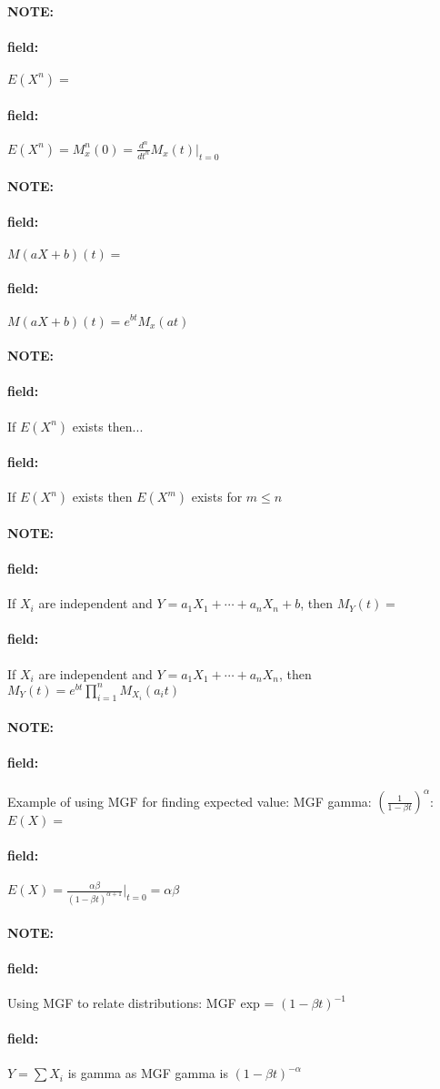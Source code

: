 \documentclass[12pt]{article}
\newenvironment{note}{\paragraph{NOTE:}}{}
\newenvironment{field}{\paragraph{field:}}{}
\begin{document}
\begin{note}
  \begin{field}
    $E(X^n) = $
  \end{field}
  \begin{field}
    $E(X^n) = M_x^n(0) = \frac{d^n}{dt^n}M_x(t)|_{t=0}$
  \end{field}
\end{note}

\begin{note}
  \begin{field}
    $M(aX + b)(t) = $
  \end{field}
  \begin{field}
    $M(aX + b)(t) = e^{bt}M_x(at)$
  \end{field}
\end{note}

\begin{note}
  \begin{field}
    If $E(X^n)$ exists then...
  \end{field}
  \begin{field}
    If $E(X^n)$ exists then $E(X^m)$ exists for $m \leq n$
  \end{field}
\end{note}

\begin{note}
  \begin{field}
    If $X_i$ are independent and $Y = a_1X_1 + \cdots + a_nX_n + b$, then $M_Y(t) = $
  \end{field}
  \begin{field}
    If $X_i$ are independent and $Y = a_1X_1 + \cdots + a_nX_n$, then $M_Y(t) = e^{bt}\prod_{i=1}^n M_{X_i}(a_i t) $
  \end{field}
\end{note}

\begin{note}
  \begin{field}
    Example of using MGF for finding expected value:
    MGF gamma: $(\frac{1}{1 - \beta t})^\alpha$: $E(X) = $
  \end{field}
  \begin{field}
    $E(X) = \frac{\alpha\beta}{(1 - \beta t)^{\alpha+1}}|_{t=0} = \alpha \beta$
  \end{field}
\end{note}

\begin{note}
  \begin{field}
    Using MGF to relate distributions: MGF exp = $( 1 - \beta t)^{-1}$
  \end{field}
  \begin{field}
    $Y = \sum X_i$ is gamma as MGF gamma is $(1 - \beta t)^{-\alpha}$
  \end{field}
\end{note}
\end{document}
